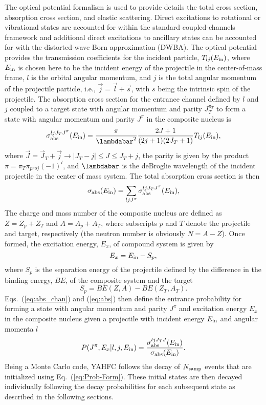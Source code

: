 \documentclass[
10pt,
showpacs,preprintnumbers,footinbib,
amsfonts,amsmath,amssymb,
aps,
prc,twocolumn,groupedaddress,superscriptaddress,
showkeys,
nofootinbib
]{revtex4-1}
\begin{document}
The optical potential formalism is used to provide details the total cross section, absorption cross section, and elastic scattering. Direct excitations to rotational or vibrational states are accounted for within the standard coupled-channels framework and additional direct excitations to ancillary states can be accounted for with the distorted-wave Born approximation (DWBA). The optical potential provides the transmission coefficients for the incident particle, $T_{lj}(E_{\rm in})$, where $E_{\rm in}$ is chosen here to be the incident energy of the projectile in the center-of-mass frame, $l$ is the orbital angular momentum, and $j$ is the total angular momentum of the projectile particle, i.e., $\vec j = \vec l + \vec s$, with $s$ being the intrinsic spin of the projectile. The absorption cross section for the entrance channel defined by $l$ and $j$ coupled to a target state with angular momentum and parity $J_T^{\pi_T}$ to form a state with angular momentum and parity $J^\pi$ in the composite nucleus is
\begin{equation}
\sigma_{\rm abs}^{ljJ_TJ^\pi}(E_{\rm in}) = \frac{\pi}{\lambdabar^2} \frac{2J + 1}{(2j+1)(2J_T+1)}T_{lj}(E_{\rm in}),
\label{eq:abs_chan}
\end{equation}
where $\vec{J} = \vec{J}_T + \vec j \rightarrow |J_T-j| \le J \le J_T + j$, the parity is given by the product $\pi = \pi_T\pi_{proj}(-1)^l$, and $\lambdabar$ is the deBroglie wavelength of the incident projectile in the center of mass system. The total absorption cross section is then
\begin{equation} 
\sigma_{\rm abs} (E_{\rm in})= \sum_{ljJ^\pi} \sigma_{\rm abs}^{ljJ_TJ^\pi}(E_{\rm in}),
\label{eq:abs}
\end{equation}
The charge and mass number of the composite nucleus are defined as $Z=Z_p+Z_T$ and $A=A_p+A_T$, where subscripts $p$ and $T$ denote the projectile and target, respectively (the neutron number is obviously $N = A - Z$). Once formed, the excitation energy, $E_x$, of compound system is given by
\begin{equation}
E_x = E_{\rm in} - S_p,
\end{equation}
where $S_p$ is the separation energy of the projectile defined by the difference in the binding energy, $BE$, of the composite system and the target
\begin{equation}
S_p = BE(Z,A) - BE(Z_T,A_T).
\end{equation}
Eqs.~(\ref{eq:abs_chan}) and (\ref{eq:abs}) then define the entrance probability for forming a state with angular momentum and parity $J^\pi$ and excitation energy $E_x$ in the composite nucleus given a projectile with incident energy $E_{\rm in}$ and angular momenta $l$
\begin{equation}
P(J^\pi,E_x|l,j,E_{\rm in}) = \frac{\sigma_{\rm abs}^{ljJ_TJ}(E_{\rm in})}{\sigma_{\rm abs} (E_{\rm in})}.
\label{eq:Prob-Form}
\end{equation}
Being a Monte Carlo code, YAHFC follows the decay of $N_{\rm samp}$ events that are initialized using Eq.~(\ref{eq:Prob-Form}). These initial states are then decayed individually following the decay probabilities for each subsequent state as described in the following sections.
\end{document}
